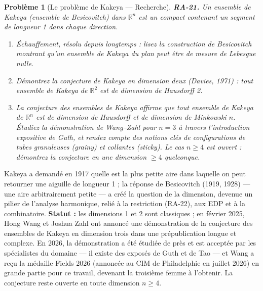 \documentclass[11pt]{article}
\newtheorem{problem}{Problème}
\begin{document}
\begin{problem}[{Le problème de Kakeya --- Recherche}]
\textbf{RA-21.} Un \textit{ensemble de Kakeya} (ensemble de Besicovitch) dans
$ \mathbb{R}^n $ est un compact contenant un segment de longueur 1 dans chaque direction.
\begin{enumerate}
\item[(a)] Échauffement, résolu depuis longtemps : lisez la construction de Besicovitch montrant qu'un
ensemble de Kakeya du plan peut être de mesure de Lebesgue nulle.
\item[(b)] Démontrez la conjecture de Kakeya en dimension deux
(Davies, 1971) : tout ensemble de Kakeya de $ \mathbb{R}^2 $ est de dimension de Hausdorff 2.
\item[(c)] La
conjecture des ensembles de Kakeya affirme que tout ensemble de Kakeya de $ \mathbb{R}^n $ est de
dimension de Hausdorff et de dimension de Minkowski $ n $. Étudiez la démonstration de Wang--Zahl
pour $ n = 3 $ à travers l'introduction expositive de Guth, et rendez compte des notions clés de
configurations de tubes granuleuses (\textit{grainy}) et collantes (\textit{sticky}). Le cas
$ n \ge 4 $ est ouvert : démontrez la conjecture en une dimension $ \ge 4 $ quelconque.
\end{enumerate}

\end{problem}

\noindent Kakeya a demandé en 1917 quelle est la plus petite aire dans laquelle on peut
retourner une aiguille de longueur 1 ; la réponse de Besicovitch (1919, 1928) --- une aire
arbitrairement petite --- a créé la question de la dimension, devenue un pilier de l'analyse
harmonique, relié à la restriction (RA-22), aux EDP et à la combinatoire. \textbf{Statut :} les
dimensions 1 et 2 sont classiques ; en février 2025, Hong Wang et Joshua Zahl ont annoncé une
démonstration de la conjecture des ensembles de Kakeya en dimension trois dans une prépublication
longue et complexe. En 2026, la démonstration a été étudiée de près et est acceptée par les
spécialistes du domaine --- il existe des exposés de Guth et de Tao --- et Wang a reçu la médaille
Fields 2026 (annoncée au CIM de Philadelphie en juillet 2026) en grande partie pour ce travail,
devenant la troisième femme à l'obtenir. La conjecture reste ouverte en toute dimension
$ n \ge 4 $.
\end{document}

